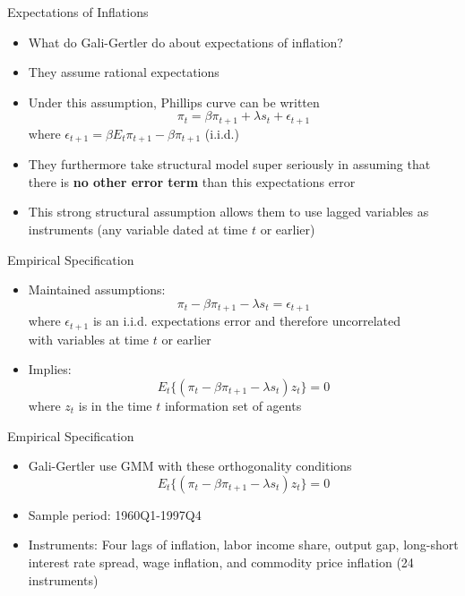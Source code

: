 \documentclass[11pt,aspectratio=169,xcolor={dvipsnames},hyperref={pdftex,pdfpagemode=UseNone,hidelinks,pdfdisplaydoctitle=true},usepdftitle=false]{beamer}
\begin{document}
\begin{frame}{Expectations of Inflations}
\begin{itemize}
\item What do Gali-Gertler do about expectations of inflation?
\item They assume rational expectations
\item Under this assumption, Phillips curve can be written
\[ \pi_{t} = \beta \pi_{t+1} + \lambda s_{t} + \epsilon_{t+1} \]
where $\epsilon_{t+1} = \beta E_{t} \pi_{t+1} - \beta \pi_{t+1}$ (i.i.d.)
\item They furthermore take structural model super seriously in assuming that there is \textbf{no other error term} than this expectations error
\item This strong structural assumption allows them to use lagged variables as instruments (any variable dated at time $t$ or earlier)
\end{itemize}
\end{frame}

\begin{frame}{Empirical Specification}
\begin{itemize}
\itemsep1em 
\item Maintained assumptions:
\[ \pi_{t} - \beta \pi_{t+1} - \lambda s_{t} = \epsilon_{t+1} \]
where $\epsilon_{t+1}$ is an i.i.d. expectations error and therefore uncorrelated \\ with variables at time $t$ or earlier
\item Implies:
\[ E_{t} \{ (\pi_{t} - \beta \pi_{t+1} - \lambda s_{t})z_{t} \} = 0 \]
where $z_{t}$ is in the time $t$ information set of agents
\end{itemize}
\end{frame}

\begin{frame}{Empirical Specification}

\begin{itemize}
\item Gali-Gertler use GMM with these orthogonality conditions
\[ E_{t} \{ (\pi_{t} - \beta \pi_{t+1} - \lambda s_{t})z_{t} \} = 0 \]
\item Sample period: 1960Q1-1997Q4
\item Instruments: Four lags of inflation, labor income share, output gap, long-short interest rate spread, wage inflation, and commodity price inflation (24 instruments)
\end{itemize}
\end{frame}
\end{document}
